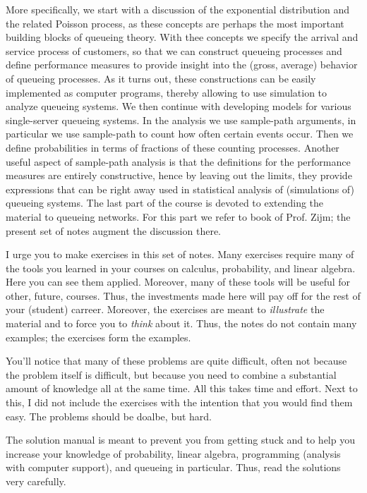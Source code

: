 More specifically, we start with a discussion of the exponential
distribution and the related Poisson process, as these concepts are
perhaps the most important building blocks of queueing theory. With
thee concepts we specify the arrival and service process of customers,
so that we can construct queueing processes and define performance
measures to provide insight into the (gross, average) behavior of
queueing processes. As it turns out, these constructions can be easily
implemented as computer programs, thereby allowing to use simulation
to analyze queueing systems. We then continue with developing models
for various single-server queueing systems. In the analysis we use
sample-path arguments, in particular we use sample-path to count how
often certain events occur. Then we define probabilities in terms of
fractions of these counting processes. Another useful aspect of
sample-path analysis is that the definitions for the performance
measures are entirely constructive, hence by leaving out the limits,
they provide expressions that can be right away used in statistical
analysis of (simulations of) queueing systems. The last part of the
course is devoted to extending the material to queueing networks. For
this part we refer to book of Prof. Zijm; the present set of notes
augment the discussion there.

I urge you to make  exercises in this set of notes. Many
exercises require many of the tools you learned in your courses on
calculus, probability, and linear algebra. Here you can see them
applied. Moreover, many of these tools will be useful for other,
future, courses. Thus, the investments made here will pay off for the
rest of your (student) carreer. Moreover, the exercises are meant to
\emph{illustrate} the material and to force you to \textit{think}
about it. Thus, the notes do not contain many examples; the exercises
form the examples.

You'll notice that many of these problems are quite difficult, often
not because the problem itself is difficult, but because you need to
combine a substantial amount of knowledge all at the same time.  All
this takes time and effort. Next to this, I did not include the
exercises with the intention that you would find them easy. The
problems should be doalbe, but hard.

The solution manual is meant to prevent you from getting stuck and to
help you increase your knowledge of probability, linear algebra,
programming (analysis with computer support), and queueing in
particular. Thus, read the solutions very carefully. 

